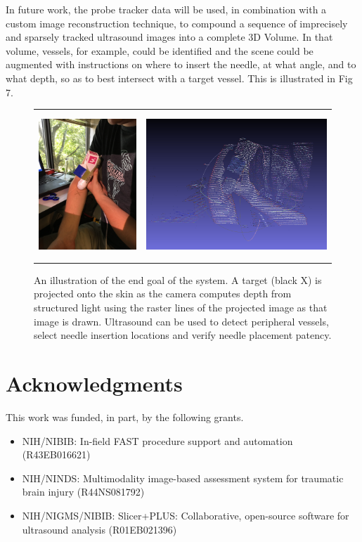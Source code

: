 \documentclass{llncs}
\begin{document}
In future work, the probe tracker data will be used, in combination with a custom image reconstruction technique, to compound a sequence of imprecisely and sparsely tracked ultrasound images into a complete 3D Volume.  In that volume, vessels, for example, could be identified and the scene could be augmented with instructions on where to insert the needle, at what angle, and to what depth, so as to best intersect with a target vessel.  This is illustrated in Fig 7.

\begin{figure}
\centering
\begin{tabular}{cc}
\centering
\includegraphics[height=5.5cm,keepaspectratio]{Hastings_arm} &
\includegraphics[height=5.5cm,keepaspectratio]{Hastings_arm_pointcloud}\\
\end{tabular}
\caption{An illustration of the end goal of the system. A target (black X) is projected onto the skin as the camera computes depth from structured light using the raster lines of the projected image as that image is drawn. Ultrasound can be used to detect peripheral vessels, select needle insertion locations and verify needle placement patency.
}
\end{figure}

\section*{Acknowledgments}
This work was funded, in part, by the following grants.
\begin{itemize}
	\item NIH/NIBIB: In-field FAST procedure support and automation (R43EB016621)
	\item NIH/NINDS: Multimodality image-based assessment system for traumatic brain injury (R44NS081792)
	\item NIH/NIGMS/NIBIB: Slicer+PLUS: Collaborative, open-source software for ultrasound analysis (R01EB021396)
\end{itemize}

%
%



\end{document}
